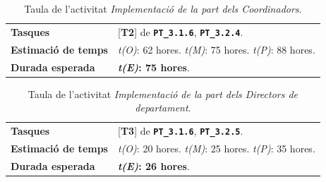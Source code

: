 \documentclass[a4paper,12pt]{ThesisStyle}
\begin{document}
\begin{table}[H]
  \begin{tabularx}{\textwidth}{l | X}
    \toprule
    \rowcolor{Blue}
    \multicolumn{2}{c}{\texttt{\textbf{A13:}} Implementació de la part dels Coordinadors}\\
    \midrule[0.9pt]
    \textbf{Tasques}                 & [\textbf{T2}] de \texttt{\textbf{PT\_3.1.6}}, \texttt{\textbf{PT\_3.2.4}}.\\
    \midrule
    \textbf{Estimació de temps}      & \textit{t(O)}: 62 hores.
    \newline \textit{t(M)}: 75 hores.
    \newline \textit{t(P)}: 88 hores.\\
    \midrule
    \textbf{Durada esperada}         & \textbf{\textit{t(E)}: 75 hores}.\\
    \bottomrule
  \end{tabularx}
  \caption{\label{taula:a13} Taula de l'activitat \emph{Implementació de la part dels Coordinadors}.}
\end{table}

\begin{table}[H]
  \begin{tabularx}{\textwidth}{l | X}
    \toprule
    \rowcolor{Blue}
    \multicolumn{2}{c}{\texttt{\textbf{A14:}} Implementació de la part dels Directors de departament}\\
    \midrule[0.9pt]
    \textbf{Tasques}                 & [\textbf{T3}] de \texttt{\textbf{PT\_3.1.6}}, \texttt{\textbf{PT\_3.2.5}}.\\
    \midrule
    \textbf{Estimació de temps}      & \textit{t(O)}: 20 hores.
    \newline \textit{t(M)}: 25 hores.
    \newline \textit{t(P)}: 35 hores.\\
    \midrule
    \textbf{Durada esperada}         & \textbf{\textit{t(E)}: 26 hores}.\\
    \bottomrule
  \end{tabularx}
  \caption{\label{taula:a14} Taula de l'activitat \emph{Implementació de la part dels Directors de departament}.}
\end{table}
\end{document}
